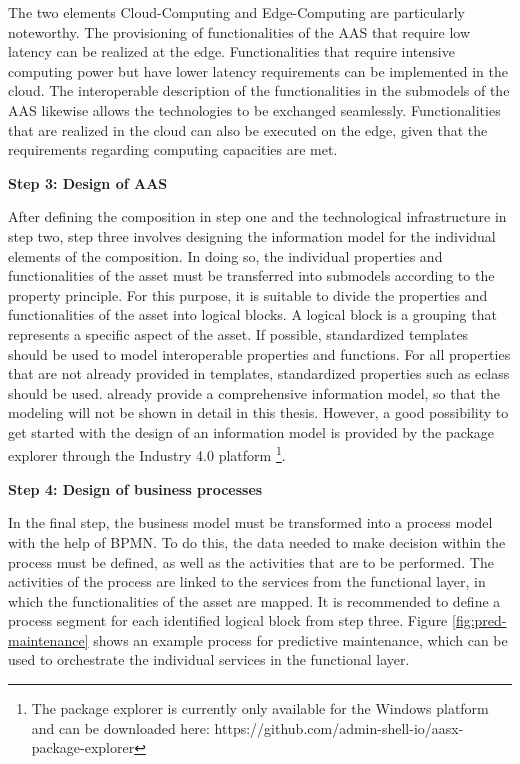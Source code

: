 The two elements Cloud-Computing and Edge-Computing are particularly noteworthy. The provisioning of functionalities of the \ac{AAS} that require low latency can be realized at the edge. Functionalities that require intensive computing power but have lower latency requirements can be implemented in the cloud. The interoperable description of the functionalities in the submodels of the \ac{AAS} likewise allows the technologies to be exchanged seamlessly. Functionalities that are realized in the cloud can also be executed on the edge, given that the requirements regarding computing capacities are met.

\textbf{Step 3: Design of \ac{AAS}}

After defining the composition in step one and the technological infrastructure in step two, step three involves designing the information model for the individual elements of the composition. In doing so, the individual properties and functionalities of the asset must be transferred into submodels according to the property principle. For this purpose, it is suitable to divide the properties and functionalities of the asset into logical blocks. A logical block is a grouping that represents a specific aspect of the asset. If possible, standardized templates should be used to model interoperable properties and functions. For all properties that are not already provided in templates, standardized properties such as eclass should be used. \citet[p. 8, 10]{Cavalieri2020AShell} already provide a comprehensive information model, so that the modeling will not be shown in detail in this thesis.  However, a good possibility to get started with the design of an information model is provided by the package explorer through the Industry 4.0 platform \footnote{The package explorer is currently only available for the Windows platform and can be downloaded here: https://github.com/admin-shell-io/aasx-package-explorer}.

\textbf{Step 4: Design of business processes}

In the final step, the business model must be transformed into a process model with the help of \ac{BPMN}. To do this, the data needed to make decision within the process must be defined, as well as the activities that are to be performed. The activities of the process are linked to the services from the functional layer, in which the functionalities of the asset are mapped. It is recommended to define a process segment for each identified logical block from step three. Figure \ref{fig:pred-maintenance} shows an example process for predictive maintenance, which can be used to orchestrate the individual services in the functional layer.

